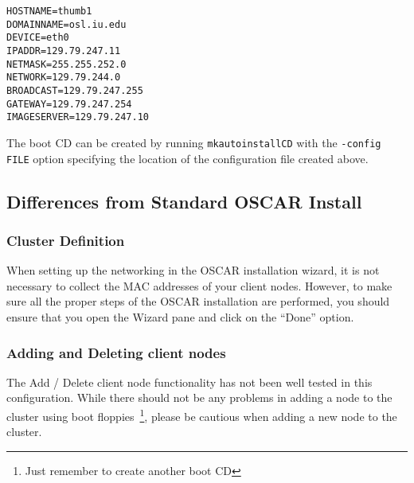 \begin{verbatim}
HOSTNAME=thumb1
DOMAINNAME=osl.iu.edu
DEVICE=eth0
IPADDR=129.79.247.11
NETMASK=255.255.252.0
NETWORK=129.79.244.0
BROADCAST=129.79.247.255
GATEWAY=129.79.247.254
IMAGESERVER=129.79.247.10
\end{verbatim}

The boot CD can be created by running {\tt mkautoinstallCD}
with the {\tt -config FILE} option specifying the location of the
configuration file created above.

\subsection{Differences from Standard OSCAR Install}

\subsubsection{Cluster Definition}

When setting up the networking in the OSCAR installation wizard, it is
not necessary to collect the MAC addresses of your client nodes.
However, to make sure all the proper steps of the OSCAR installation
are performed, you should ensure that you open the Wizard pane and
click on the ``Done'' option.

\subsubsection{Adding and Deleting client nodes}

The Add / Delete client node functionality has not been well tested in
this configuration.  While there should not be any problems in adding
a node to the cluster using boot floppies~\footnote{Just remember to
create another boot CD}, please be cautious when adding a new node
to the cluster.
